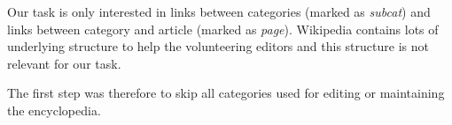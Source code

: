 Our task is only interested in links between categories (marked as \emph{subcat}) and links between category and article (marked as \emph{page}). Wikipedia contains lots of underlying structure to help the volunteering editors and this structure is not relevant for our task. 


The first step was therefore to skip all categories used for editing or maintaining the encyclopedia. 

\begin{comment}

i.e., \emph{articles}, \emph{redirects}, \emph{wikidata} etc. Table \ref{tab:withoutwords} shows how the numbers of links are reduced when these words are removed, but these words are not the only way to removed irrelevant links. 
 
\begin{table}[ht]
\centering
\begin{tabular}{l|c|c}
\textbf{Links between...} & \textbf{W the words} & \textbf{W/o the words}  \\ \hline
 \textbf{subcategories} & 3.341.524 & 2.826.815  \\
 \textbf{articles and categories} & 78.535.744 & 27.804.524
\end{tabular}
\caption[Number of links without words common for editing]{Number of links when common words for editing are removed}
\label{tab:withoutwords}
\end{table}

\end{comment}